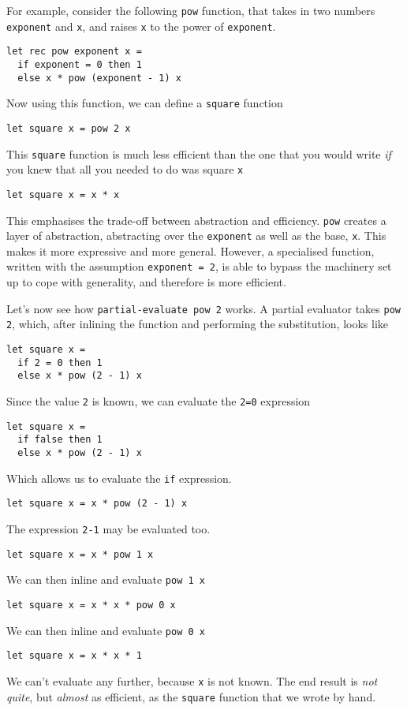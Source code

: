 For example, consider the following \texttt{pow} function, that takes in two numbers \texttt{exponent} and \texttt{x}, and raises \texttt{x} to the power of \texttt{exponent}. 
\begin{verbatim}
let rec pow exponent x = 
  if exponent = 0 then 1
  else x * pow (exponent - 1) x
\end{verbatim}
Now using this function, we can define a \texttt{square} function
\begin{verbatim}
let square x = pow 2 x
\end{verbatim}
This \texttt{square} function is much less efficient than the one that you would write \textit{if} you knew that all you needed to do was square \texttt{x}
\begin{verbatim}
let square x = x * x
\end{verbatim}
This emphasises the trade-off between abstraction and efficiency. \texttt{pow} creates a layer of abstraction, abstracting over the \texttt{exponent} as well as the base, \texttt{x}. This makes it more expressive and more general. However, a specialised function, written with the assumption \texttt{exponent = 2}, is able to bypass the machinery set up to cope with generality, and therefore is more efficient. 

Let's now see how \texttt{partial-evaluate pow 2} works. A partial evaluator takes \texttt{pow 2}, which, after inlining the function and performing the substitution, looks like
\begin{verbatim}
let square x =   
  if 2 = 0 then 1
  else x * pow (2 - 1) x
\end{verbatim}
Since the value \texttt{2} is known, we can evaluate the \texttt{2=0} expression
\begin{verbatim}
let square x =   
  if false then 1
  else x * pow (2 - 1) x
\end{verbatim}
Which allows us to evaluate the \texttt{if} expression.
\begin{verbatim}
let square x = x * pow (2 - 1) x
\end{verbatim}
The expression \texttt{2-1} may be evaluated too.
\begin{verbatim}
let square x = x * pow 1 x
\end{verbatim}
We can then inline and evaluate \texttt{pow 1 x}
\begin{verbatim}
let square x = x * x * pow 0 x
\end{verbatim}
We can then inline and evaluate \texttt{pow 0 x}
\begin{verbatim}
let square x = x * x * 1
\end{verbatim}
We can't evaluate any further, because \texttt{x} is not known. The end result is \textit{not quite}, but \textit{almost} as efficient, as the \texttt{square} function that we wrote by hand. 


